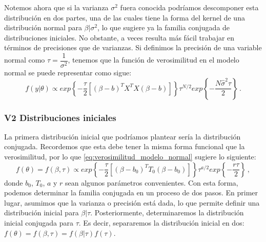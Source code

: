 Notemos ahora que si la varianza $\sigma^2$ fuera conocida podríamos descomponer esta distribución en dos partes, una de las cuales tiene la forma del kernel de una distribución normal para $\beta|\sigma^2$, lo que sugiere ya la familia conjugada de distribuciones iniciales. No obstante, a veces resulta más fácil trabajar en términos de precisiones que de varianzas. Si definimos la precisión de una variable normal como $\tau=\dfrac{1}{\sigma^2}$, tenemos que la función de verosimilitud en el modelo normal se puede representar como sigue: 
\begin{equation} \label{eq:verosimilitud_modelo_normal}
f(y|\theta) \propto exp\left\lbrace -\dfrac{\tau}{2}\left[(\beta-b)^TX^TX(\beta-b)\right] \right\rbrace \tau^{N/2}exp\left\lbrace -\dfrac{N\hat{\sigma}^2\tau}{2}\right\rbrace \,.
\end{equation}

\subsubsection*{V2 Distribuciones iniciales}

La primera distribución inicial que podríamos plantear sería la distribución conjugada. Recordemos que esta debe tener la misma forma funcional que la verosimilitud, por lo que \eqref{eq:verosimilitud_modelo_normal} sugiere lo siguiente: 
\begin{equation*}
f(\theta)= f(\beta,\tau) \propto exp\left\lbrace -\dfrac{\tau}{2}\left[(\beta-b_0)^TT_0(\beta-b_0)\right] \right\rbrace \tau^{a/2} exp\left\lbrace -\dfrac{r\tau}{2}\right\rbrace \,,
\end{equation*}
donde $b_0$, $T_0$, $a$ y $r$ sean algunos parámetros convenientes. Con esta forma, podemos determinar la familia conjugada en un proceso de dos pasos. En primer lugar, asumimos que la varianza o precisión está dada, lo que permite definir una distribución inicial para $\beta|\tau$. Posteriormente, determinaremos la distribución inicial conjugada para $\tau$. Es decir, separaremos la distribución inicial en dos: $f(\theta)=f(\beta,\tau)=f(\beta|\tau)f(\tau)$.\\ 

